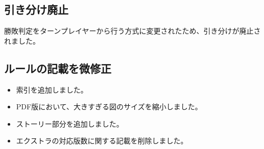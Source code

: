 \documentclass[letterpaper,10pt,dvipdfmx]{sphinxmanual}
\begin{document}
\subsection{引き分け廃止}
\label{\detokenize{revision-history/7th:id6}}
\sphinxAtStartPar
勝敗判定をターンプレイヤーから行う方式に変更されたため、引き分けが廃止されました。


\subsection{ルールの記載を微修正}
\label{\detokenize{revision-history/7th:id7}}\begin{itemize}
\item {} 
\sphinxAtStartPar
索引を追加しました。

\item {} 
\sphinxAtStartPar
PDF版において、大きすぎる図のサイズを縮小しました。

\item {} 
\sphinxAtStartPar
ストーリー部分を追加しました。

\item {} 
\sphinxAtStartPar
エクストラの対応版数に関する記載を削除しました。

\end{itemize}



\renewcommand{\indexname}{索引}
\printindex
\end{document}
